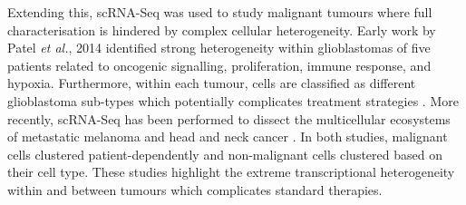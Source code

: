 Extending this, scRNA-Seq was used to study malignant tumours where full characterisation is hindered by complex cellular heterogeneity. Early work by Patel \emph{et al.}, 2014 identified strong heterogeneity within glioblastomas of five patients related to oncogenic signalling, proliferation, immune response, and hypoxia. Furthermore, within each tumour, cells are classified as different glioblastoma sub-types which potentially complicates treatment strategies \citep{Patel2014}. More recently, scRNA-Seq has been performed to dissect the multicellular ecosystems of metastatic melanoma \citep{Tirosh2016} and head and neck cancer \citep{Puram2017}. In both studies, malignant cells clustered patient-dependently and non-malignant cells clustered based on their cell type. These studies highlight the extreme transcriptional heterogeneity within and between tumours which complicates standard therapies. \\

